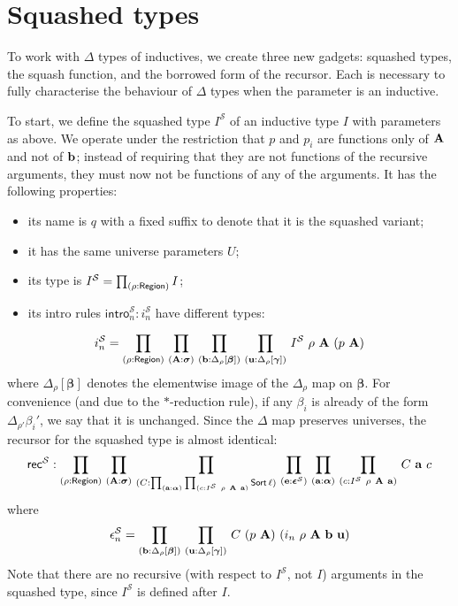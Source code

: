 \section{Squashed types}
To work with \( \Delta \) types of inductives, we create three new gadgets: squashed types, the squash function, and the borrowed form of the recursor.
Each is necessary to fully characterise the behaviour of \( \Delta \) types when the parameter is an inductive.

To start, we define the squashed type \( I^{\mathcal S} \) of an inductive type \( I \) with parameters as above.
We operate under the restriction that \( p \) and \( p_i \) are functions only of \( \vb A \) and not of \( \vb b \); instead of requiring that they are not functions of the recursive arguments, they must now not be functions of any of the arguments.
It has the following properties:
\begin{itemize}
	\item its name is \( q \) with a fixed suffix to denote that it is the squashed variant;
	\item it has the same universe parameters \( U \);
	\item its type is \( I^{\mathcal S} = \prd{\rho : \Region} I \);
	\item its intro rules \( \mathsf{intro}_n^{\mathcal S} : i_n^{\mathcal S} \) have different types:
\end{itemize}
\[ i_n^{\mathcal S} = \prd{\rho : \Region}{\vb A : \bm \sigma}{\vb b : \Delta_\rho[\bm \beta]}{\vb u : \Delta_\rho[\bm \gamma]} I^{\mathcal S}\ \rho\ \vb A\ (p\ \vb A) \]
where \( \Delta_\rho[\bm \beta] \) denotes the elementwise image of the \( \Delta_\rho \) map on \( \bm \beta \).
For convenience (and due to the \( \ast \)-reduction rule), if any \( \beta_i \) is already of the form \( \Delta_{\rho'} \beta_i' \), we say that it is unchanged.
Since the \( \Delta \) map preserves universes, the recursor for the squashed type is almost identical:
\[ \mathsf{rec}^{\mathcal S} : \prd{\rho : \Region}{\vb A : \bm \sigma}{C : \prd{\vb a : \bm \alpha}{c : I^{\mathcal S}\ \rho\ \vb A\ \vb a} \Sort \ell}{\vb e : \bm \epsilon^{\mathcal S}}{\vb a : \bm \alpha}{c : I^{\mathcal S}\ \rho\ \vb A\ \vb a} C\ \vb a\ c \]
where
\[ \epsilon_n^{\mathcal S} = \prd{\vb b : \Delta_\rho[\bm \beta]}{\vb u : \Delta_\rho[\bm \gamma]} C\ (p\ \vb A)\ (i_n\ \rho\ \vb A\ \vb b\ \vb u) \]
Note that there are no recursive (with respect to \( I^{\mathcal S} \), not \( I \)) arguments in the squashed type, since \( I^{\mathcal S} \) is defined after \( I \).
